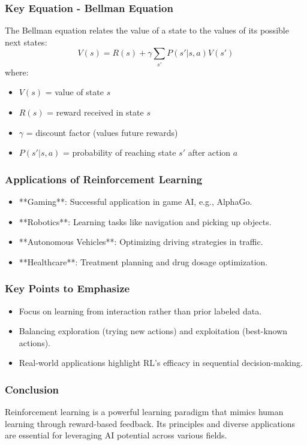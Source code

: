 \documentclass[aspectratio=169]{beamer}
\begin{document}
\begin{frame}[fragile]
    \frametitle{Key Equation - Bellman Equation}
    The Bellman equation relates the value of a state to the values of its possible next states:
    \begin{equation}
        V(s) = R(s) + \gamma \sum_{s'} P(s' | s, a) V(s')
    \end{equation}
    where:
    \begin{itemize}
        \item $V(s)$ = value of state $s$
        \item $R(s)$ = reward received in state $s$
        \item $\gamma$ = discount factor (values future rewards)
        \item $P(s' | s, a)$ = probability of reaching state $s'$ after action $a$
    \end{itemize}
\end{frame}

\begin{frame}[fragile]
    \frametitle{Applications of Reinforcement Learning}
    \begin{itemize}
        \item **Gaming**: Successful application in game AI, e.g., AlphaGo.
        \item **Robotics**: Learning tasks like navigation and picking up objects.
        \item **Autonomous Vehicles**: Optimizing driving strategies in traffic.
        \item **Healthcare**: Treatment planning and drug dosage optimization.
    \end{itemize}
\end{frame}

\begin{frame}[fragile]
    \frametitle{Key Points to Emphasize}
    \begin{itemize}
        \item Focus on learning from interaction rather than prior labeled data.
        \item Balancing exploration (trying new actions) and exploitation (best-known actions).
        \item Real-world applications highlight RL’s efficacy in sequential decision-making.
    \end{itemize}
\end{frame}

\begin{frame}[fragile]
    \frametitle{Conclusion}
    Reinforcement learning is a powerful learning paradigm that mimics human learning through reward-based feedback. Its principles and diverse applications are essential for leveraging AI potential across various fields.
\end{frame}
\end{document}
